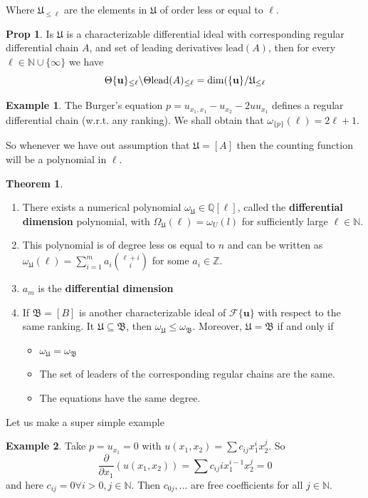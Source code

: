 \documentclass{article}
\theoremstyle{definition}
\newtheorem{thm}{Theorem}
\newtheorem*{prop}{Prop}
\newtheorem{ex}{Example}
\newcommand{\Z}{\mathbb{Z}}
\newcommand{\N}{\mathbb{N}}
\begin{document}
Where $\mathfrak U_{\leq\ell}$ are the elements in $\mathfrak U$ of order less or equal to $\ell$.
\begin{prop}
    Is $\mathfrak U$ is a characterizable differential ideal with corresponding regular differential chain $A$, and set of leading derivatives $\text{lead}(A)$, then for every $\ell\in\N\cup\{\infty\}$ we have
    $$\Theta\{\mathbf{u}\}_{\leq\ell}\backslash\Theta\text{lead}(A)_{\leq\ell}=\dim(\mathcal \{\mathbf{u}\}/\mathfrak U_{\leq\ell}$$
\end{prop}
\begin{ex}
    The Burger's equation $p = u_{x_1,x_1} - u_{x_2} - 2u u_{x_1}$ defines a regular differential chain (w.r.t. any ranking). We shall obtain that $\omega_{\{p\}}(\ell) = 2\ell + 1$.
\end{ex}
So whenever we have out assumption that $\mathfrak U=[A]$ then the counting function will be a polynomial in $\ell$.
\begin{thm}\leavevmode
    \begin{enumerate}
        \item There exists a numerical polynomial $\omega_{\mathfrak U} \in \mathbb{Q}[\ell]$, called the \textbf{differential dimension }polynomial, with $\Omega_{\mathfrak U}(\ell) = \omega_U(l)$ for sufficiently large $\ell \in \mathbb{N}$.
        \item This polynomial is of degree less os equal to $n$ and can be written as $\omega_{\mathfrak U}(\ell)=\sum_{i=1}^ma_i{\ell+i\choose i}$ for some $a_i\in\Z$.
        \item $a_m$ is the \textbf{differential dimension}
        \item If $\mathfrak B=[B]$ is another characterizable ideal of $\mathcal F\{\mathbf{u}\}$ with respect to the same ranking. It $\mathfrak U\subseteq\mathfrak B$, then $\omega_{\mathfrak U}\leq\omega_{\mathfrak B}$. Moreover, $\mathfrak U=\mathfrak B$ if and only if
        \begin{itemize}
            \item $\omega_{\mathfrak U}=\omega_{\mathfrak B}$
            \item The set of leaders of the corresponding regular chains are the same.
            \item The equations have the same degree.
        \end{itemize}
    \end{enumerate}
\end{thm}
Let us make a super simple example
\begin{ex}
    Take $p=u_{x_1}=0$ with $u(x_1,x_2)=\sum c_{ij}x^i_1x^j_2$. So
    $$\frac{\partial}{\partial x_1}(u(x_1,x_2))=\sum c_{ij}ix^{i-1}_1x^j_2=0$$
    and here $c_{ij}=0\forall i>0, j\in\N$. Then $c_{0j},...$ are free coefficients for all $j\in\N$.
\end{ex}
\end{document}
